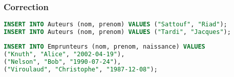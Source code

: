 \documentclass[svgnames,11pt]{beamer}
\begin{document}
\begin{frame}[fragile]
    \frametitle{Correction}

    \begin{center}
        \begin{lstlisting}[language=SQL , basicstyle=\ttfamily\small, xleftmargin=2em, xrightmargin=2em]
INSERT INTO Auteurs (nom, prenom) VALUES ("Sattouf", "Riad");
INSERT INTO Auteurs (nom, prenom) VALUES ("Tardi", "Jacques");
\end{lstlisting}
    \end{center}

    \begin{center}
        \begin{lstlisting}[language=SQL , basicstyle=\ttfamily\small, xleftmargin=0em, xrightmargin=-1em]
INSERT INTO Emprunteurs (nom, prenom, naissance) VALUES 
("Knuth", "Alice", "2002-04-19"),
("Nelson", "Bob", "1990-07-24"),
("Viroulaud", "Christophe", "1987-12-08");
\end{lstlisting}
    \end{center}
\end{frame}
\end{document}

